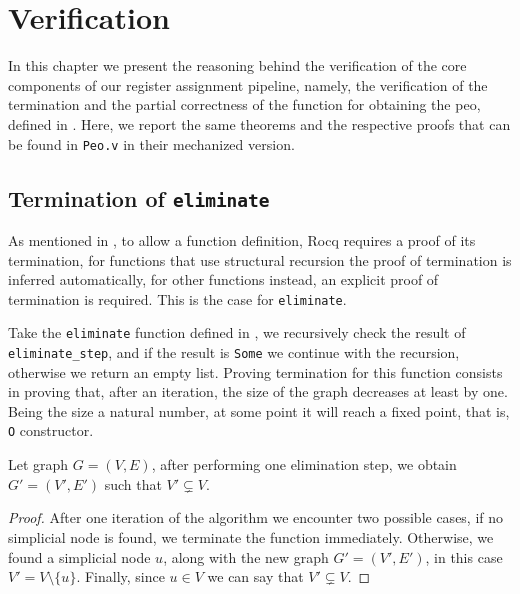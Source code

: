 
\chapter{Verification}
\label{cha:verification}

In this chapter we present the reasoning behind the verification of the core components of our register assignment pipeline, namely, the verification of the termination and the partial correctness of the function for obtaining the \gls{peo}, defined in . Here, we report the same theorems and the respective proofs that can be found in \texttt{Peo.v} in their mechanized version.

\section{Termination of \texttt{eliminate}}

As mentioned in , to allow a function definition, Rocq requires a proof of its termination, for functions that use structural recursion the proof of termination is inferred automatically, for other functions instead, an explicit proof of termination is required. This is the case for \texttt{eliminate}.

Take the \texttt{eliminate} function defined in , we recursively check the result of \texttt{eliminate\_step}, and if the result is \texttt{Some} we continue with the recursion, otherwise we return an empty list. Proving termination for this function consists in proving that, after an iteration, the size of the graph decreases at least by one. Being the size a natural number, at some point it will reach a fixed point, that is, \texttt{O} constructor.

\begin{theorem}
    Let graph $G = (V, E)$, after performing one elimination step, we obtain $G' = (V', E')$ such that $V' \subsetneq V$.
\end{theorem}
\begin{proof}
    After one iteration of the algorithm we encounter two possible cases, if no simplicial node is found, we terminate the function immediately. Otherwise, we found a simplicial node $u$, along with the new graph $G' = (V', E')$, in this case $V' = V \setminus \{ u \}$. Finally, since $u \in V$ we can say that $V' \subsetneq V$.
\end{proof}

